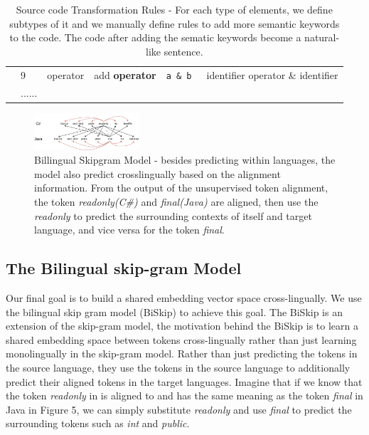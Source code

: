 \begin{table}
{\begin{tabular}{p{2cm}|p{0.79cm}|p{2cm}|p{3cm}|p{4cm}|p{4cm}}
			&9& operator & add \textbf{operator} & \texttt{a \& b }&  identifier operator \& identifier \\\cline{2-6}
			&......&&&& \\\cline{2-6}
			
			
			\hline
	\end{tabular}}
	\medskip
	\caption{Source code Transformation Rules - For each type of elements, we define subtypes of it and we manually define rules to add more semantic keywords to the code. The code after adding the sematic keywords become a natural-like sentence.}
	\label{tab:transform_rules}
\end{table}


\begin{figure}[t!]
	\includegraphics[width=0.35\textwidth]{biskip_align}
	\caption{Billingual Skipgram Model - besides predicting within languages, the model also predict crosslingually based on the alignment information. From the output of the unsupervised token alignment, the token \textit{readonly(C\#)} and \textit{final(Java)} are aligned, then use the \textit{readonly} to predict the surrounding contexts of itself and target language, and vice versa for the token \textit{final}.}
	\label{fig:biskip_align}
\end{figure}

\subsection{The Bilingual skip-gram Model}

Our final goal is to build a shared embedding vector space cross-lingually. We use the bilingual skip gram model (BiSkip) \cite{luong2015bilingual} to achieve this goal. The BiSkip is an extension of the skip-gram model, the motivation behind the BiSkip is to learn a shared embedding space between tokens cross-lingually rather than just learning monolingually in the skip-gram model. Rather than just predicting the tokens in the source language, they use the tokens in the source language to additionally predict their aligned tokens in the target languages. Imagine that if we know that the token \textit{readonly} in  is aligned to and has the same meaning as the token \textit{final} in Java in Figure 5, we can simply substitute \textit{readonly} and use \textit{final} to predict the surrounding tokens such as \textit{int} and \textit{public}. 

